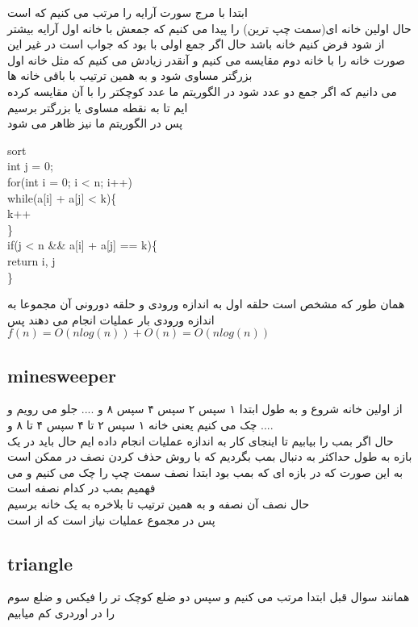 \documentclass[a4paper]{article}
\begin{document}
ابتدا با مرج سورت آرایه را مرتب می کنیم که 
است\\
حال اولین خانه ای(سمت چپ ترین) را پیدا می کنیم که جمعش با خانه اول آرایه بیشتر از 
شود
فرض کنیم خانه 
باشد
حال اگر جمع اولی با 
بود که جواب است در غیر این صورت خانه 
را با خانه دوم مقایسه می کنیم و آنقدر زیادش می کنیم که مثل خانه اول بزرگتر مساوی 
شود و به همین ترتیب با باقی خانه ها\\
می دانیم که اگر جمع دو عدد 
شود در الگوریتم ما عدد کوچکتر را با آن مقایسه کرده ایم تا به نقطه مساوی یا بزرگتر برسیم\\
پس در الگوریتم ما نیز ظاهر می شود\\
\begin{latin}
sort\\
int j = 0;\\
for(int i = 0; i < n; i++)\\
while(a[i] + a[j] < k)\{\\
k++\\
\}\\
if(j < n \&\& a[i] + a[j] == k)\{\\
return i, j\\
\}\\
\end{latin}
همان طور که مشخص است حلقه اول به اندازه ورودی و حلقه دورونی آن مجموعا به اندازه ورودی بار عملیات انجام می دهند پس\\
$f(n) = O(nlog(n)) +O(n) = O(nlog(n))$
\newpage
\begin{latin}
\section*{minesweeper}
\end{latin}
از اولین خانه شروع و به طول ابتدا ۱ سپس ۲ سپس ۴ سپس ۸ و .... جلو می رویم و چک می کنیم یعنی خانه ۱ سپس ۲ تا ۴ سپس ۴ تا ۸ و ....\\
حال اگر بمب را بیابیم تا اینجای کار به اندازه
عملیات انجام داده ایم
حال باید در یک بازه به طول حداکثر 
به دنبال بمب بگردیم که با روش حذف کردن نصف در  
ممکن است\\
به این صورت که در بازه ای که بمب بود ابتدا نصف سمت چپ را چک می کنیم و می فهمیم بمب در کدام نصفه است\\
حال نصف آن نصفه و به همین ترتیب تا بلاخره به یک خانه برسیم\\
پس در مجموع
عملیات نیاز است که از 
است

\newpage
\begin{latin}
\section*{triangle}
\end{latin}
همانند سوال قبل ابتدا مرتب می کنیم و سپس دو ضلع کوچک تر را فیکس و ضلع سوم را در اوردری کم میابیم
\end{document}
